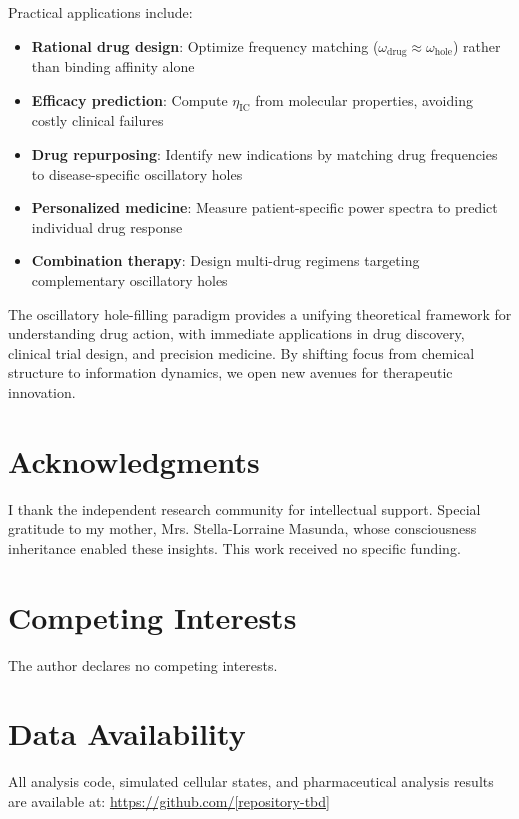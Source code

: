 \documentclass{article}
\begin{document}
Practical applications include:

\begin{itemize}
    \item \textbf{Rational drug design}: Optimize frequency matching ($\omega_{\text{drug}} \approx \omega_{\text{hole}}$) rather than binding affinity alone
    \item \textbf{Efficacy prediction}: Compute $\eta_{\text{IC}}$ from molecular properties, avoiding costly clinical failures
    \item \textbf{Drug repurposing}: Identify new indications by matching drug frequencies to disease-specific oscillatory holes
    \item \textbf{Personalized medicine}: Measure patient-specific power spectra to predict individual drug response
    \item \textbf{Combination therapy}: Design multi-drug regimens targeting complementary oscillatory holes
\end{itemize}

The oscillatory hole-filling paradigm provides a unifying theoretical framework for understanding drug action, with immediate applications in drug discovery, clinical trial design, and precision medicine. By shifting focus from chemical structure to information dynamics, we open new avenues for therapeutic innovation.

\section*{Acknowledgments}

I thank the independent research community for intellectual support. Special gratitude to my mother, Mrs. Stella-Lorraine Masunda, whose consciousness inheritance enabled these insights. This work received no specific funding.

\section*{Competing Interests}

The author declares no competing interests.

\section*{Data Availability}

All analysis code, simulated cellular states, and pharmaceutical analysis results are available at: \url{https://github.com/[repository-tbd]}



\end{document}
